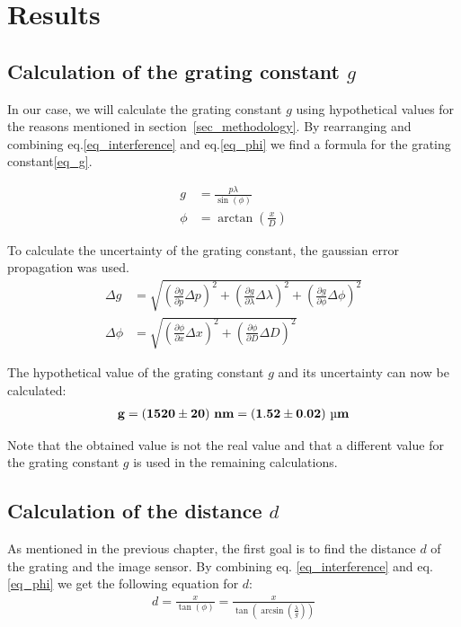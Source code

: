 \section{Results}\label{sec_results}

\subsection{Calculation of the grating constant $g$}

In our case, we will calculate the grating constant $g$ using hypothetical values for the reasons mentioned in section~\ref{sec_methodology}.
By rearranging and combining eq.\ref{eq_interference} and eq.\ref{eq_phi} we find a formula for the grating constant\ref{eq_g}.

\begin{align}
    g &= \frac{p \lambda}{\sin(\phi)} \label{eq_g}\\
    \phi &= \arctan \left( \frac{x}{D} \right)
\end{align}

To calculate the uncertainty of the grating constant, the gaussian error propagation was used.
\begin{align}
    \Delta g &= \sqrt{\left( \frac{\partial g}{\partial p} \Delta p \right)^2 + \left( \frac{\partial g}{\partial \lambda} \Delta \lambda \right)^2 + \left( \frac{\partial g}{\partial \phi} \Delta \phi \right)^2}\\
    \Delta \phi &= \sqrt{\left( \frac{\partial \phi}{\partial x} \Delta x \right)^2 + \left( \frac{\partial \phi}{\partial D} \Delta D \right)^2}
\end{align}

The hypothetical value of the grating constant $g$ and its uncertainty can now be calculated:
\begin{align}
    \bf g = (1520 \pm 20) ~\si{\bf\nano\meter} = (1.52 \pm 0.02) ~\si{\bf\micro\meter} \label{res_g}
\end{align}

Note that the obtained value is not the real value and that a different value for the grating constant $g$ \cite{src_grating_constant} is used in the remaining calculations.

\subsection{Calculation of the distance $d$}

As mentioned in the previous chapter, the first goal is to find the distance $d$ of the grating
and the image sensor.
By combining eq. \ref{eq_interference} and eq. \ref{eq_phi} we get the following equation for $d$:
\begin{align}
    d = \frac{x}{\tan(\phi)} = \frac{x}{\tan(\arcsin(\frac{\lambda}{g}))} \label{eq_distance}
\end{align}

